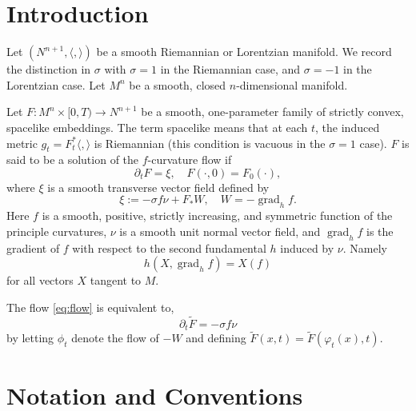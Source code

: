 \documentclass{amsart}
\theoremstyle{definition}
\theoremstyle{remark}
\newcommand{\ip}[2]{\ensuremath{\langle{#1},{#2}\rangle}}
\DeclareMathOperator{\grad}{grad}
\numberwithin{equation}{section}
\begin{document}
\title[]
 {}

\curraddr{}
\email{}
\date{\today}

\dedicatory{}
\subjclass[2010]{}
\keywords{}

\begin{abstract}

\end{abstract}

\maketitle

\section{Introduction}

Let $(N^{n+1},\ip{}{})$ be a smooth Riemannian or Lorentzian manifold. We record the distinction in \(\sigma\) with \(\sigma = 1\) in the Riemannian case, and \(\sigma = -1\) in the Lorentzian case. Let $M^n$ be a smooth, closed $n$-dimensional manifold.

Let $F\colon M^n\times [0,T)\to N^{n+1}$ be a smooth, one-parameter family of strictly convex, spacelike embeddings. The term spacelike means that at each \(t\), the induced metric \(g_t = F_t^{\ast} \ip{}{}\) is Riemannian (this condition is vacuous in the \(\sigma = 1\) case). \(F\) is said to be a solution of the $f$-curvature flow if
\begin{equation}
\label{eq:flow}
\partial_tF = \xi,\quad F(\cdot, 0) = F_0(\cdot),
\end{equation}
where $\xi $ is a smooth transverse vector field defined by
\begin{equation}
\label{eq:transverse_vector}
\xi := -\sigma f\nu + F_{\ast} W, \quad W = -\grad_h f.
\end{equation}
Here $f$ is a smooth, positive, strictly increasing, and symmetric function of the principle curvatures, $\nu$ is a smooth unit normal vector field, and $\grad_h f$ is the gradient of $f$ with respect to the second fundamental $h$ induced by $\nu$. Namely
\[
h(X, \grad_h f) = X(f)
\]
for all vectors $X$ tangent to $M$.

The flow \eqref{eq:flow} is equivalent to,
\[
\partial_t \tilde{F} = -\sigma f \nu
\]
by letting \(\phi_t\) denote the flow of \(-W\) and defining \(\tilde{F} (x, t) = \tilde{F}(\varphi_t(x), t)\).

\section{Notation and Conventions}
\end{document}
